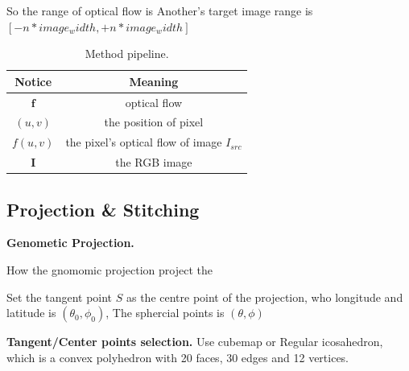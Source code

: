 So the range of optical flow is 
Another's target image range is $[- n * image_width, + n * image_width]$


\begin{table}
	\begin{center}
		\begin{tabular}{ c | c } 
			\hline
			Notice & Meaning  \\ [0.5ex] 
			\hline\hline
			$\textbf{f}$ & optical flow  \\ 
			\hline
			$(u,v)$ & the position of pixel   \\
			\hline
			$f(u,v)$ & the pixel's optical flow of image $I_{src}$ \\
			\hline
			$\textbf{I}$ & the RGB image  \\ [1ex] 
			\hline
		\end{tabular}
	\end{center}
	\caption{Method pipeline. }
	\label{tab:approach:notation}
\end{table}

\subsection{Projection \& Stitching}

\textbf{Genometic Projection.}

How the gnomomic projection project the 

Set the tangent point $S$ as the centre point of the projection, who longitude and latitude is $(\theta_0, \phi_0)$,
The sphercial points is $(\theta, \phi)$



\textbf{Tangent/Center points selection.}
Use cubemap or Regular icosahedron, which is a convex polyhedron with 20 faces, 30 edges and 12 vertices.

%


